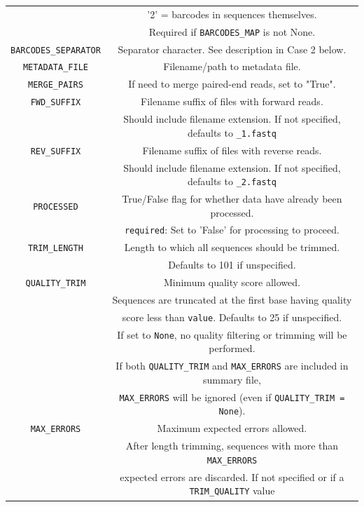 \documentclass[11pt, oneside]{article}   	%
\begin{document}
\begin{center}
\begin{longtable}{| c | c |}
       &  '2' = barcodes in sequences themselves. \\
       & Required if {\tt BARCODES\_MAP} is not None. \\
       \hline
       {\tt BARCODES\_SEPARATOR} & Separator character.  See description in Case 2 below. \\
       \hline
       {\tt METADATA\_FILE} & Filename/path to metadata file. \\
       \hline
       {\tt MERGE\_PAIRS} & If need to merge paired-end reads, set to "True". \\
       \hline
       {\tt FWD\_SUFFIX} & Filename suffix of files with forward reads. \\
       & Should include filename extension. If not specified, defaults to {\tt \_1.fastq}\\
       \hline
       {\tt REV\_SUFFIX} & Filename suffix of files with reverse reads. \\
       & Should include filename extension. If not specified, defaults to {\tt \_2.fastq}\\
       \hline
       {\tt PROCESSED} & True/False flag for whether data have already been processed. \\
        & {\tt required}: Set to 'False' for processing to proceed. \\
        \hline
        {\tt TRIM\_LENGTH} & Length to which all sequences should be trimmed.  \\
        & Defaults to 101 if unspecified. \\
        \hline
        {\tt QUALITY\_TRIM} & Minimum quality score allowed.  \\
        & Sequences are truncated at the first base having quality \\
        & score less than {\tt value}.  Defaults to 25 if unspecified. \\
        & If set to {\tt None}, no quality filtering or trimming will be performed. \\
        & If both {\tt QUALITY\_TRIM} and {\tt MAX\_ERRORS} are included in summary file, \\
        & {\tt MAX\_ERRORS} will be ignored (even if {\tt QUALITY\_TRIM = None}). \\
        \hline
		{\tt MAX\_ERRORS} & Maximum expected errors allowed. \\
		& After length trimming, sequences with more than {\tt MAX\_ERRORS} \\
		& expected errors are discarded. If not specified or if a {\tt TRIM\_QUALITY} value \\

\end{longtable}
\end{center}
\end{document}
